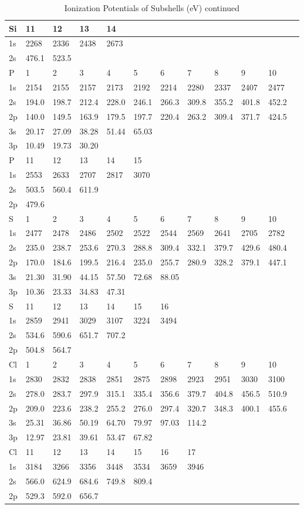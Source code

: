 \begin{table}
\caption{Ionization Potentials of Subshells (eV) continued}
\begin{tabular}{llllllllllll}
\hline
Si&  11&  12&  13&  14\\
\hline
1s&  2268&  2336&  2438&  2673\\
2s& 476.1& 523.5\\
P&    1&   2&   3&
4&   5&   6&   7&   8&   9&  10\\
1s&  2154&  2155&  2157&  2173&  2192&  2214&  2280&  2337&
2407&  2477\\
2s& 194.0& 198.7& 212.4& 228.0& 246.1& 266.3& 309.8& 355.2& 401.8& 452.2\\
2p&
140.0& 149.5& 163.9& 179.5& 197.7& 220.4& 263.2& 309.4& 371.7& 424.5\\
3s& 20.17& 27.09&
38.28& 51.44& 65.03\\3p& 10.49& 19.73& 30.20\\
\hline
P&   11&  12&  13&  14&  15\\
\hline
1s&  2553&  2633&
2707&  2817&  3070\\
2s& 503.5& 560.4& 611.9\\
2p& 479.6\\
\hline
S&    1&   2&   3&   4&   5&   6&
7&  8&   9&  10\\
\hline
1s&  2477&  2478&  2486&  2502&  2522&  2544&  2569&  2641&  2705&  2782\\
2s&
235.0& 238.7& 253.6& 270.3& 288.8& 309.4& 332.1& 379.7& 429.6& 480.4\\
2p& 170.0& 184.6&
199.5& 216.4& 235.0& 255.7& 280.9& 328.2& 379.1& 447.1\\
3s& 21.30& 31.90& 44.15& 57.50&
72.68& 88.05\\
3p& 10.36& 23.33& 34.83& 47.31\\
\hline
S&   11&  12& 13&  14&  15&  16\\
\hline
1s&  2859&
2941&  3029&  3107&  3224&  3494\\
2s& 534.6& 590.6& 651.7& 707.2\\
2p& 504.8& 564.7\\
\hline
Cl&
1&   2&   3&   4&   5&   6&   7&   8&   9&  10\\
\hline
1s&  2830&  2832&  2838&  2851&  2875&  2898&
2923&  2951&  3030&  3100\\
2s& 278.0& 283.7& 297.9& 315.1& 335.4& 356.6& 379.7& 404.8&
456.5& 510.9\\
2p& 209.0& 223.6& 238.2& 255.2& 276.0& 297.4& 320.7& 348.3& 400.1& 455.6\\
3s&
25.31& 36.86& 50.19& 64.70& 79.97& 97.03& 114.2\\
3p& 12.97& 23.81& 39.61& 53.47& 67.82\\
\hline
Cl&
11&  12&  13&  14&  15&  16&  17\\
\hline
1s&  3184&  3266&  3356&  3448&  3534&  3659&  3946\\
2s&
566.0& 624.9& 684.6& 749.8& 809.4\\
2p& 529.3& 592.0& 656.7\\
\hline
\end{tabular}
\end{table}




